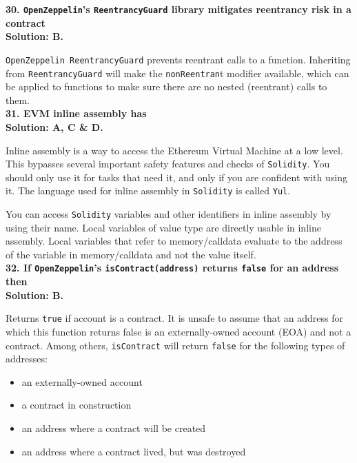 \textbf{30. \texttt{OpenZeppelin}'s \texttt{ReentrancyGuard} library mitigates reentrancy risk in a contract}\label{sec:exam3_q30}\\

\textbf{Solution: B.}

\verb|OpenZeppelin ReentrancyGuard| prevents reentrant calls to a function.
Inheriting from \verb|ReentrancyGuard| will make the \verb|nonReentran|t modifier available, which can be applied to functions to make sure there are no nested (reentrant) calls to them.\\

\textbf{31. EVM inline assembly has}\label{sec:exam3_q31}\\

\textbf{Solution: A, C \& D.}

Inline assembly is a way to access the Ethereum Virtual Machine at a low level.
This bypasses several important safety features and checks of \verb|Solidity|.
You should only use it for tasks that need it, and only if you are confident with using it.
The language used for inline assembly in \verb|Solidity| is called \verb|Yul|.

You can access \verb|Solidity| variables and other identifiers in inline assembly by using their name.
Local variables of value type are directly usable in inline assembly.
Local variables that refer to memory/calldata evaluate to the address of the variable in memory/calldata and not the value itself.\\

\textbf{32. If \texttt{OpenZeppelin}'s \texttt{isContract(address)} returns \texttt{false} for an address then}\label{sec:exam3_q32}\\

\textbf{Solution: B.}

Returns \verb|true| if account is a contract.
It is unsafe to assume that an address for which this function returns false is an externally-owned account (EOA) and not a contract.
Among others, \verb|isContract| will return \verb|false| for the following types of addresses:

\begin{itemize}
    \item an externally-owned account
    \item a contract in construction
    \item an address where a contract will be created
    \item an address where a contract lived, but was destroyed
\end{itemize}